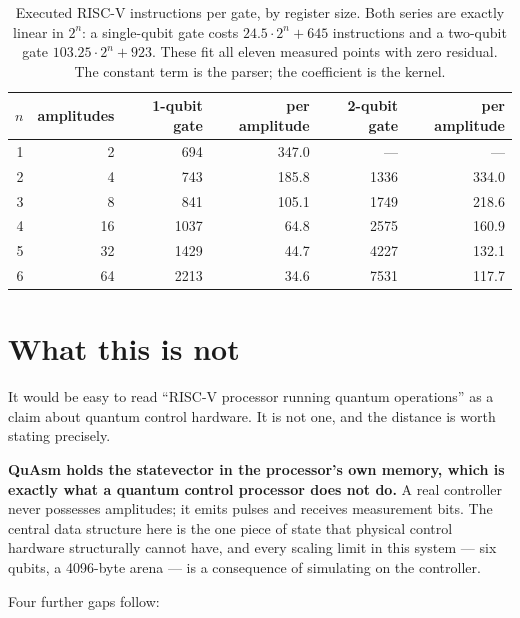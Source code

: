 \documentclass[11pt]{article}
\newcommand{\quasm}{QuAsm}
\begin{document}
\begin{table}[t]
\centering
\begin{tabular}{rrrrrr}
\toprule
$n$ & amplitudes & 1-qubit gate & per amplitude & 2-qubit gate & per amplitude \\
\midrule
1 & 2  & 694  & 347.0 & ---  & --- \\
2 & 4  & 743  & 185.8 & 1336 & 334.0 \\
3 & 8  & 841  & 105.1 & 1749 & 218.6 \\
4 & 16 & 1037 & 64.8  & 2575 & 160.9 \\
5 & 32 & 1429 & 44.7  & 4227 & 132.1 \\
6 & 64 & 2213 & 34.6  & 7531 & 117.7 \\
\bottomrule
\end{tabular}
\caption{Executed RISC-V instructions per gate, by register size. Both series are exactly
linear in $2^n$: a single-qubit gate costs $24.5 \cdot 2^n + 645$ instructions and a
two-qubit gate $103.25 \cdot 2^n + 923$. These fit all eleven measured points with zero
residual. The constant term is the parser; the coefficient is the kernel.}
\label{tab:cost}
\end{table}

\section{What this is not}
\label{sec:limits}

It would be easy to read ``RISC-V processor running quantum operations'' as a claim about
quantum control hardware. It is not one, and the distance is worth stating precisely.

\textbf{\quasm{} holds the statevector in the processor's own memory, which is exactly what
a quantum control processor does not do.} A real controller never possesses amplitudes; it
emits pulses and receives measurement bits. The central data structure here is the one piece
of state that physical control hardware structurally cannot have, and every scaling limit in
this system --- six qubits, a 4096-byte arena --- is a consequence of simulating on the
controller.

Four further gaps follow:
\end{document}

